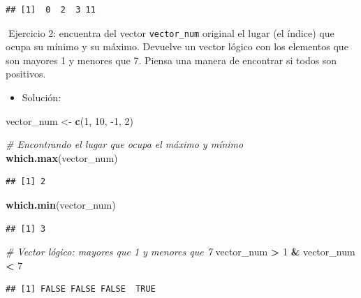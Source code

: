 \documentclass[11pt,]{book}
\newenvironment{Shaded}{\begin{snugshade}}{\end{snugshade}}
\newcommand{\CommentTok}[1]{\textcolor[rgb]{0.37,0.37,0.37}{\textit{#1}}}
\newcommand{\DecValTok}[1]{\textcolor[rgb]{0.06,0.06,0.06}{#1}}
\newcommand{\KeywordTok}[1]{\textcolor[rgb]{0.27,0.27,0.27}{\textbf{#1}}}
\newcommand{\NormalTok}[1]{#1}
\newcommand{\OperatorTok}[1]{\textcolor[rgb]{0.43,0.43,0.43}{\textbf{#1}}}
\newcommand{\StringTok}[1]{\textcolor[rgb]{0.5,0.5,0.5}{#1}}
\providecommand{\tightlist}{%
  \setlength{\itemsep}{0pt}\setlength{\parskip}{0pt}}
\begin{document}
\begin{verbatim}
## [1]  0  2  3 11
\end{verbatim}

📝Ejercicio 2: encuentra del vector \texttt{vector\_num} original el lugar (el índice) que ocupa su mínimo y su máximo. Devuelve un vector lógico con los elementos que son mayores 1 y menores que 7. Piensa una manera de encontrar si todos son positivos.

\begin{itemize}
\tightlist
\item
  Solución:
\end{itemize}

\begin{Shaded}
\begin{Highlighting}[]
\NormalTok{vector_num <-}\StringTok{ }\KeywordTok{c}\NormalTok{(}\DecValTok{1}\NormalTok{, }\DecValTok{10}\NormalTok{, }\DecValTok{-1}\NormalTok{, }\DecValTok{2}\NormalTok{)}

\CommentTok{# Encontrando el lugar que ocupa el máximo y mínimo}
\KeywordTok{which.max}\NormalTok{(vector_num)}
\end{Highlighting}
\end{Shaded}

\begin{verbatim}
## [1] 2
\end{verbatim}

\begin{Shaded}
\begin{Highlighting}[]
\KeywordTok{which.min}\NormalTok{(vector_num)}
\end{Highlighting}
\end{Shaded}

\begin{verbatim}
## [1] 3
\end{verbatim}

\begin{Shaded}
\begin{Highlighting}[]
\CommentTok{# Vector lógico: mayores que 1 y menores que 7}
\NormalTok{vector_num }\OperatorTok{>}\StringTok{ }\DecValTok{1} \OperatorTok{&}\StringTok{ }\NormalTok{vector_num }\OperatorTok{<}\StringTok{ }\DecValTok{7}
\end{Highlighting}
\end{Shaded}

\begin{verbatim}
## [1] FALSE FALSE FALSE  TRUE
\end{verbatim}
\end{document}
